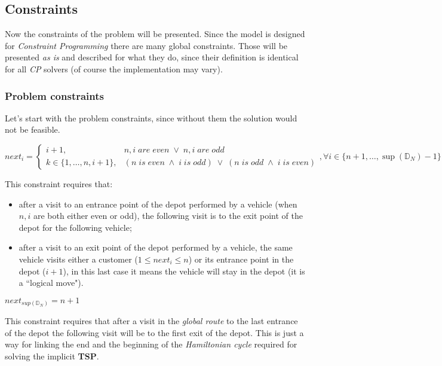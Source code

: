 \documentclass[../main.tex]{subfiles}
\begin{document}
\subsection{Constraints}
Now the constraints of the problem will be presented. Since the model is designed for \textit{Constraint Programming} there are many global constraints.
Those will be presented \textit{as is} and described for what they do, since their definition is identical for all \textit{CP} solvers (of course the implementation may vary).
\subsubsection{Problem constraints}
Let's start with the problem constraints, since without them the solution would not be feasible.\\
\begin{center} %
    \begin{math}
        next_i =
        \begin{cases}
            i+1, & \text{$n, i$} \; are \; even \; \vee \; \text{$n, i$} \; are \; odd\\
            \text{$k \in\{1, \dots, n, i+1\}$}, & (\text{$n$} \; is \; even \; \wedge \; \text{$i$} \; is \; odd ) \; \vee \; (\text{$n$} \; is \; odd \; \wedge \; \text{$i$} \; is \; even )
        \end{cases},
        \forall i \in \{n+1,\dots,\sup{}(\mathbb{D}_N) - 1\}
    \end{math}
\end{center}
This constraint requires that:
\begin{itemize}
    \item after a visit to an entrance point of the depot performed by a vehicle (when $n, i$ are both either even or odd), the following visit is to the exit point of the depot for the following vehicle;
    \item after a visit to an exit point of the depot performed by a vehicle, the same vehicle visits either a customer ($1 \leq next_i \leq n$) or its entrance point in the depot ($i+1$), in this last case it means the vehicle will stay in the depot (it is a ``logical move").
\end{itemize}

\begin{center} %
    \begin{math}
        next_{sup(\mathbb{D}_N)} = n+1
    \end{math}
\end{center}
This constraint requires that after a visit in the \textit{global route} to the last entrance of the depot the following visit will be to the first exit of the depot. This is just a way for linking the end and the beginning of the \textit{Hamiltonian cycle} required for solving the implicit \textbf{TSP}.
\end{document}
